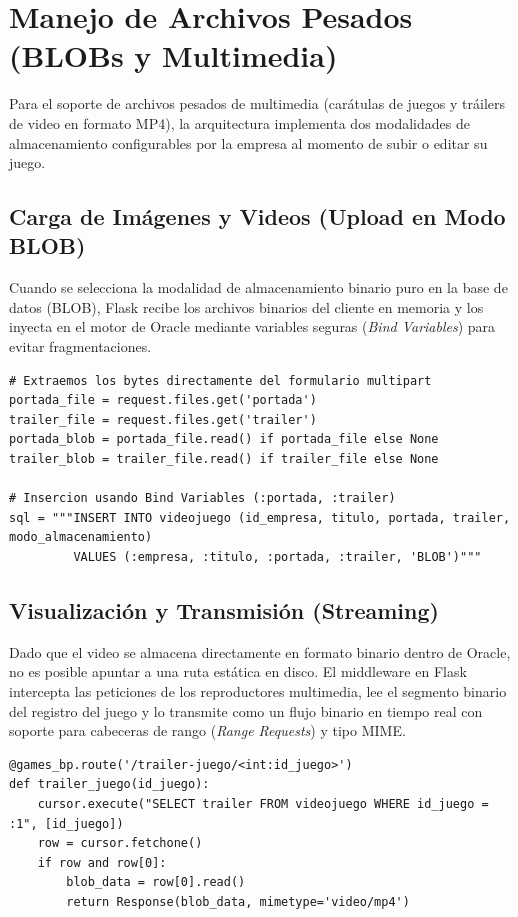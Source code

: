 \documentclass[12pt,a4paper]{article}
\begin{document}
\section{Manejo de Archivos Pesados (BLOBs y Multimedia)}
Para el soporte de archivos pesados de multimedia (carátulas de juegos y tráilers de video en formato MP4), la arquitectura implementa dos modalidades de almacenamiento configurables por la empresa al momento de subir o editar su juego.

\subsection{Carga de Imágenes y Videos (Upload en Modo BLOB)}
Cuando se selecciona la modalidad de almacenamiento binario puro en la base de datos (BLOB), Flask recibe los archivos binarios del cliente en memoria y los inyecta en el motor de Oracle mediante variables seguras (\textit{Bind Variables}) para evitar fragmentaciones.

\begin{lstlisting}[caption=games\_controller.py (Carga de BLOBs)]
# Extraemos los bytes directamente del formulario multipart
portada_file = request.files.get('portada')
trailer_file = request.files.get('trailer')
portada_blob = portada_file.read() if portada_file else None
trailer_blob = trailer_file.read() if trailer_file else None

# Insercion usando Bind Variables (:portada, :trailer)
sql = """INSERT INTO videojuego (id_empresa, titulo, portada, trailer, modo_almacenamiento) 
         VALUES (:empresa, :titulo, :portada, :trailer, 'BLOB')"""
\end{lstlisting}

\subsection{Visualización y Transmisión (Streaming)}
Dado que el video se almacena directamente en formato binario dentro de Oracle, no es posible apuntar a una ruta estática en disco. El middleware en Flask intercepta las peticiones de los reproductores multimedia, lee el segmento binario del registro del juego y lo transmite como un flujo binario en tiempo real con soporte para cabeceras de rango (\textit{Range Requests}) y tipo MIME.

\begin{lstlisting}[caption=games\_controller.py (Servicio de BLOB y Streaming)]
@games_bp.route('/trailer-juego/<int:id_juego>')
def trailer_juego(id_juego):
    cursor.execute("SELECT trailer FROM videojuego WHERE id_juego = :1", [id_juego])
    row = cursor.fetchone()
    if row and row[0]:
        blob_data = row[0].read()
        return Response(blob_data, mimetype='video/mp4')
\end{lstlisting}
\end{document}
